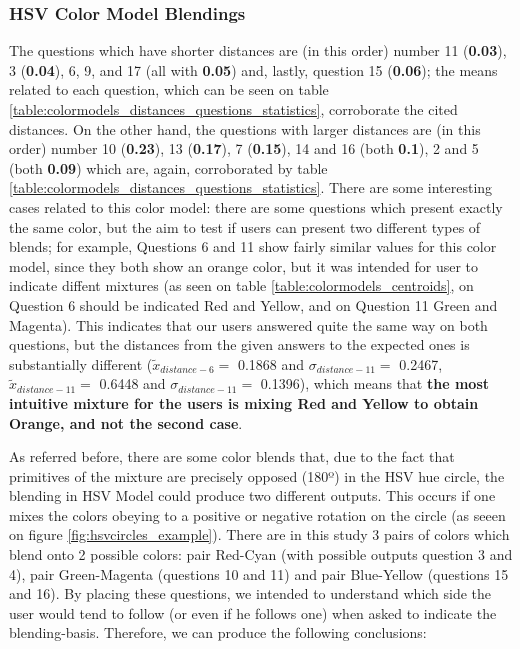 \subsubsection{HSV Color Model Blendings}
\label{subsubsec:hsvcolormodel}
%
The questions which have shorter distances are (in this order) number 11 (\textbf{0.03}), 3 (\textbf{0.04}), 6, 9, and 17 (all with \textbf{0.05}) and, lastly, question 15 (\textbf{0.06}); the means related to each question, which can be
seen on table \ref{table:colormodels_distances_questions_statistics}, corroborate the cited distances. On the other hand, the questions with larger distances are (in this order) number 10 (\textbf{0.23}), 13 (\textbf{0.17}), 7 (\textbf{0.15}), 14 and 16 (both \textbf{0.1}), 2 and
5 (both \textbf{0.09}) which are, again, corroborated by table \ref{table:colormodels_distances_questions_statistics}. There are some interesting cases related to this color model: there are some questions which present exactly the same color, but the aim to test if users can present
two different types of blends; for example, Questions 6 and 11 show fairly similar values for this color model, since they both show an orange color, but it was intended for user to indicate diffent mixtures (as seen on table \ref{table:colormodels_centroids}, on Question 6 should be
indicated Red and Yellow, and on Question 11 Green and Magenta). This indicates that our users answered quite the same way on both questions, but the distances from the given answers to the expected ones is substantially different ($\tilde{x}_{distance-6} = $ 0.1868 and
$\sigma_{distance-11} = $ 0.2467, $\tilde{x}_{distance-11} = $ 0.6448 and $\sigma_{distance-11} = $ 0.1396), which means that \textbf{the most intuitive mixture for the users is mixing Red and Yellow to obtain Orange, and not the second case}. \par
%
As referred before, there are some color blends that, due to the fact that primitives of the mixture are precisely opposed (180º) in the HSV hue circle, the blending in HSV Model could produce two different outputs. This occurs if one mixes the colors obeying to a positive or negative
rotation on the circle (as seeen on figure \ref{fig:hsvcircles_example}). There are in this study 3 pairs of colors which blend onto 2 possible colors: pair Red-Cyan (with possible outputs question 3 and 4), pair Green-Magenta (questions 10 and 11) and pair Blue-Yellow (questions 15
and 16). By placing these questions, we intended to understand which side the user would tend to follow (or even if he follows one) when asked to indicate the blending-basis. Therefore, we can produce the following conclusions:
